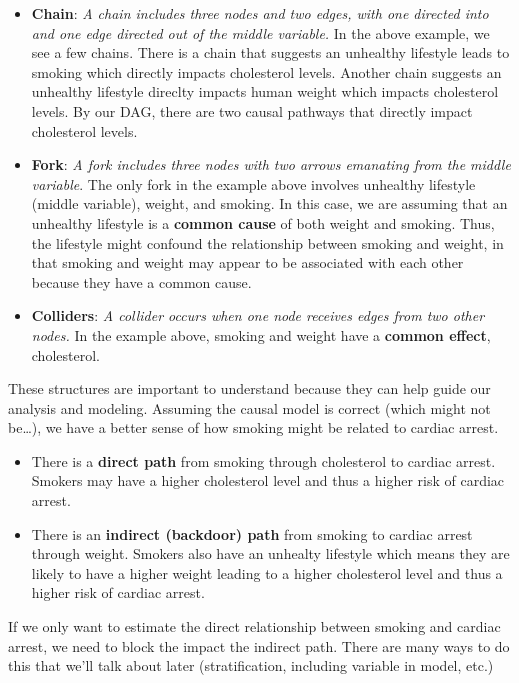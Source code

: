 \documentclass[]{book}
\providecommand{\tightlist}{%
  \setlength{\itemsep}{0pt}\setlength{\parskip}{0pt}}
\begin{document}
\begin{itemize}
\item
  \textbf{Chain}: \emph{A chain includes three nodes and two edges, with one directed into and one edge directed out of the middle variable.} In the above example, we see a few chains. There is a chain that suggests an unhealthy lifestyle leads to smoking which directly impacts cholesterol levels. Another chain suggests an unhealthy lifestyle direclty impacts human weight which impacts cholesterol levels. By our DAG, there are two causal pathways that directly impact cholesterol levels.
\item
  \textbf{Fork}: \emph{A fork includes three nodes with two arrows emanating from the middle variable}. The only fork in the example above involves unhealthy lifestyle (middle variable), weight, and smoking. In this case, we are assuming that an unhealthy lifestyle is a \textbf{common cause} of both weight and smoking. Thus, the lifestyle might confound the relationship between smoking and weight, in that smoking and weight may appear to be associated with each other because they have a common cause.
\item
  \textbf{Colliders}: \emph{A collider occurs when one node receives edges from two other nodes.} In the example above, smoking and weight have a \textbf{common effect}, cholesterol.
\end{itemize}

These structures are important to understand because they can help guide our analysis and modeling. Assuming the causal model is correct (which might not be\ldots{}), we have a better sense of how smoking might be related to cardiac arrest.

\begin{itemize}
\tightlist
\item
  There is a \textbf{direct path} from smoking through cholesterol to cardiac arrest. Smokers may have a higher cholesterol level and thus a higher risk of cardiac arrest.
\item
  There is an \textbf{indirect (backdoor) path} from smoking to cardiac arrest through weight. Smokers also have an unhealty lifestyle which means they are likely to have a higher weight leading to a higher cholesterol level and thus a higher risk of cardiac arrest.
\end{itemize}

If we only want to estimate the direct relationship between smoking and cardiac arrest, we need to block the impact the indirect path. There are many ways to do this that we'll talk about later (stratification, including variable in model, etc.)
\end{document}
